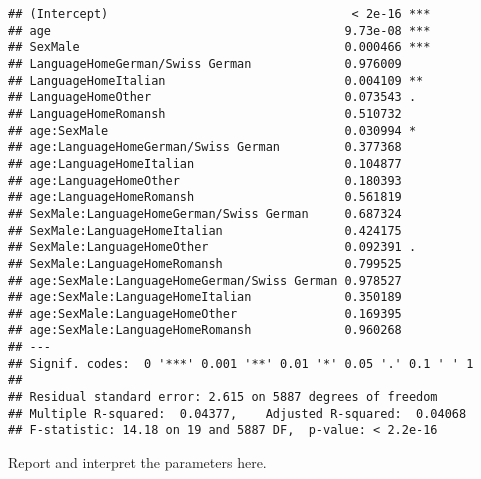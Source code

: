 \documentclass[
]{book}
\begin{document}
\begin{verbatim}
## (Intercept)                                  < 2e-16 ***
## age                                         9.73e-08 ***
## SexMale                                     0.000466 ***
## LanguageHomeGerman/Swiss German             0.976009    
## LanguageHomeItalian                         0.004109 ** 
## LanguageHomeOther                           0.073543 .  
## LanguageHomeRomansh                         0.510732    
## age:SexMale                                 0.030994 *  
## age:LanguageHomeGerman/Swiss German         0.377368    
## age:LanguageHomeItalian                     0.104877    
## age:LanguageHomeOther                       0.180393    
## age:LanguageHomeRomansh                     0.561819    
## SexMale:LanguageHomeGerman/Swiss German     0.687324    
## SexMale:LanguageHomeItalian                 0.424175    
## SexMale:LanguageHomeOther                   0.092391 .  
## SexMale:LanguageHomeRomansh                 0.799525    
## age:SexMale:LanguageHomeGerman/Swiss German 0.978527    
## age:SexMale:LanguageHomeItalian             0.350189    
## age:SexMale:LanguageHomeOther               0.169395    
## age:SexMale:LanguageHomeRomansh             0.960268    
## ---
## Signif. codes:  0 '***' 0.001 '**' 0.01 '*' 0.05 '.' 0.1 ' ' 1
## 
## Residual standard error: 2.615 on 5887 degrees of freedom
## Multiple R-squared:  0.04377,    Adjusted R-squared:  0.04068 
## F-statistic: 14.18 on 19 and 5887 DF,  p-value: < 2.2e-16
\end{verbatim}

Report and interpret the parameters here.
\end{document}
